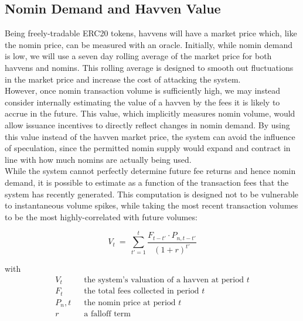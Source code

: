 \newpage

\subsection{Nomin Demand and Havven Value}

\noindent Being freely-tradable ERC20 tokens, havvens will have a market
price which, like the nomin price, can be measured with an oracle. Initially,
while nomin demand is low, we will use a seven day rolling average of the
market price for both havvens and nomins. This rolling average is designed to
smooth out fluctuations in the market price and increase the cost of
attacking the system.\\

\noindent However, once nomin transaction volume is sufficiently high, we may
instead consider internally estimating the value of a havven by the fees it
is likely to accrue in the future. This value, which implicitly measures
nomin volume, would allow issuance incentives to directly reflect changes in
nomin demand. By using this value instead of the havven market price, the
system can avoid the influence of speculation, since the permitted nomin
supply would expand and contract in line with how much nomins are actually
being used. \\

\noindent While the system cannot perfectly determine future fee returns and
hence nomin demand, it is possible to estimate as a function of the
transaction fees that the system has recently generated. This computation is
designed not to be vulnerable to instantaneous volume spikes, while taking
the most recent transaction volumes to be the most highly-correlated with
future volumes:
\vspace{3mm}

\begin{equation}
    V_{t} \ = \ \sum_{t'=1}^{t} \frac{F_{t - t'} \cdot P_{n,t - t'}}{(1 + r)^{t'}} \label{eq:price}
\end{equation}

with
\begin{align*} 
V_{t} \ \ & \text{ the system's valuation of a havven at period } t  \\
F_t \ \ & \text{ the total fees collected in period } t\\
P_n,t \ \ & \text{ the nomin price at period } t\\
r \ \ & \text{ a falloff term}  \\
\end{align*}

